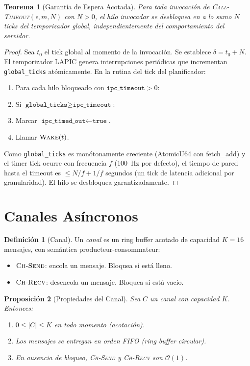 \documentclass[11pt,twoside,openright]{book}
\theoremstyle{definition}
\newtheorem{definition}{Definición}[chapter]
\theoremstyle{plain}
\newtheorem{theorem}{Teorema}[chapter]
\newtheorem{proposition}[theorem]{Proposición}
\theoremstyle{remark}
\newcommand{\bigO}{\mathcal{O}}
\begin{document}
\begin{theorem}[Garantía de Espera Acotada]
\label{thm:bounded-wait}
Para toda invocación de \textsc{Call-Timeout}$(\epsilon, m, N)$ con $N > 0$, el hilo
invocador se desbloquea en a lo sumo $N$ ticks del temporizador global, independientemente
del comportamiento del servidor.
\end{theorem}

\begin{proof}
Sea $t_0$ el tick global al momento de la invocación. Se establece $\delta = t_0 + N$.
El temporizador LAPIC genera interrupciones periódicas que incrementan
\texttt{global\_ticks} atómicamente. En la rutina del tick del planificador:

\begin{enumerate}
    \item Para cada hilo bloqueado con $\texttt{ipc\_timeout} > 0$:
    \item Si $\texttt{global\_ticks} \geq \texttt{ipc\_timeout}$:
    \item Marcar $\texttt{ipc\_timed\_out} \gets \texttt{true}$.
    \item Llamar $\textsc{Wake}(t)$.
\end{enumerate}

Como \texttt{global\_ticks} es monótonamente creciente (AtomicU64 con fetch\_add) y el
timer tick ocurre con frecuencia $f$ (100~Hz por defecto), el tiempo de pared hasta el
timeout es $\leq N/f + 1/f$ segundos (un tick de latencia adicional por granularidad).
El hilo se desbloquea garantizadamente.
\end{proof}

\section{Canales Asíncronos}

\begin{definition}[Canal]
\label{def:channel}
Un \emph{canal} es un ring buffer acotado de capacidad $K = 16$ mensajes, con semántica
producteur-consommateur:
\begin{itemize}
    \item $\textsc{Ch-Send}$: encola un mensaje. Bloquea si está lleno.
    \item $\textsc{Ch-Recv}$: desencola un mensaje. Bloquea si está vacío.
\end{itemize}
\end{definition}

\begin{proposition}[Propiedades del Canal]
\label{prop:channel-props}
Sea $C$ un canal con capacidad $K$. Entonces:
\begin{enumerate}
    \item $0 \leq |C| \leq K$ en todo momento (acotación).
    \item Los mensajes se entregan en orden FIFO (ring buffer circular).
    \item En ausencia de bloqueo, \textsc{Ch-Send} y \textsc{Ch-Recv} son $\bigO(1)$.
\end{enumerate}
\end{proposition}
\end{document}
